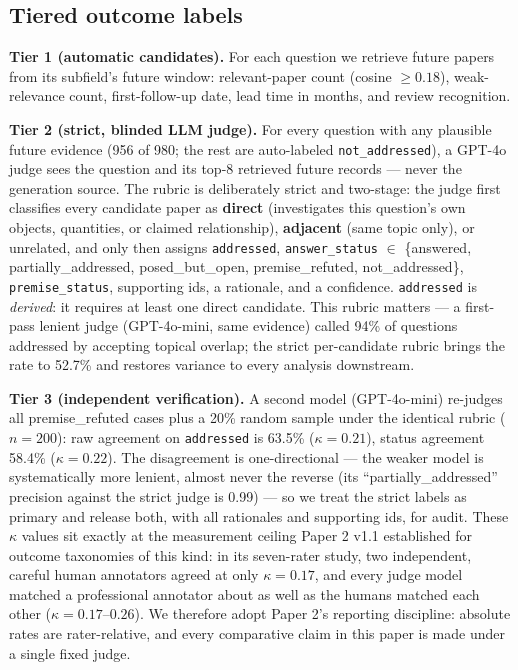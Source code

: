 \documentclass[11pt]{article}
\newcommand{\addressedrate}{52.7\%}
\begin{document}
\subsection{Tiered outcome labels}

\textbf{Tier 1 (automatic candidates).} For each question we retrieve
future papers from its subfield's future window: relevant-paper count
(cosine $\geq 0.18$), weak-relevance count, first-follow-up date, lead
time in months, and review recognition.

\textbf{Tier 2 (strict, blinded LLM judge).} For every question with any
plausible future evidence (956 of 980; the rest are auto-labeled
\texttt{not\_addressed}), a GPT-4o judge sees the question and its top-8
retrieved future records --- never the generation source. The rubric is
deliberately strict and two-stage: the judge first classifies every
candidate paper as \textbf{direct} (investigates this question's own
objects, quantities, or claimed relationship), \textbf{adjacent} (same
topic only), or unrelated, and only then assigns \texttt{addressed},
\texttt{answer\_status} $\in$ \{answered, partially\_addressed,
posed\_but\_open, premise\_refuted, not\_addressed\},
\texttt{premise\_status}, supporting ids, a rationale, and a confidence.
\texttt{addressed} is \emph{derived}: it requires at least one direct
candidate. This rubric matters --- a first-pass lenient judge
(GPT-4o-mini, same evidence) called 94\% of questions addressed by
accepting topical overlap; the strict per-candidate rubric brings the
rate to \addressedrate{} and restores variance to every analysis
downstream.

\textbf{Tier 3 (independent verification).} A second model (GPT-4o-mini)
re-judges all premise\_refuted cases plus a 20\% random sample under the
identical rubric ($n=200$): raw agreement on \texttt{addressed} is 63.5\%
($\kappa = 0.21$), status agreement 58.4\% ($\kappa = 0.22$). The
disagreement is one-directional --- the weaker model is systematically
more lenient, almost never the reverse (its ``partially\_addressed''
precision against the strict judge is 0.99) --- so we treat the strict
labels as primary and release both, with all rationales and supporting
ids, for audit. These $\kappa$ values sit exactly at the measurement
ceiling Paper 2 v1.1 established for outcome taxonomies of this kind:
in its seven-rater study, two independent, careful human annotators
agreed at only $\kappa=0.17$, and every judge model matched a
professional annotator about as well as the humans matched each other
($\kappa=0.17$--$0.26$). We therefore adopt Paper 2's reporting
discipline: absolute rates are rater-relative, and every comparative
claim in this paper is made under a single fixed judge.
\end{document}
